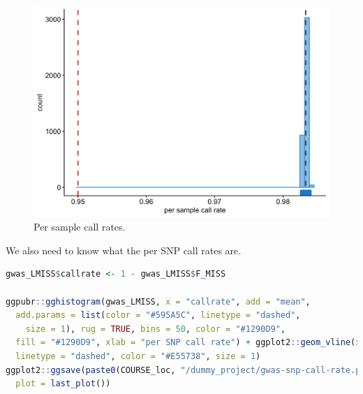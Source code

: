 \documentclass[
]{book}
\begin{document}
\begin{figure}[H]

{\centering \includegraphics[width=18.67in]{img/_gwas_dummy/show-sample-callrate-gwas} 

}

\caption{Per sample call rates.}\label{fig:show-sample-callrate-gwas}
\end{figure}

We also need to know what the per SNP call rates are.

\begin{lstlisting}[language=R]
gwas_LMISS$callrate <- 1 - gwas_LMISS$F_MISS

ggpubr::gghistogram(gwas_LMISS, x = "callrate", add = "mean",
  add.params = list(color = "#595A5C", linetype = "dashed",
    size = 1), rug = TRUE, bins = 50, color = "#1290D9",
  fill = "#1290D9", xlab = "per SNP call rate") + ggplot2::geom_vline(xintercept = 0.95,
  linetype = "dashed", color = "#E55738", size = 1)
ggplot2::ggsave(paste0(COURSE_loc, "/dummy_project/gwas-snp-call-rate.png"),
  plot = last_plot())
\end{lstlisting}
\end{document}
